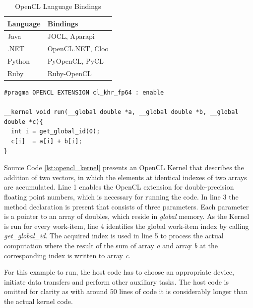 \begin{table}[htb]
	\centering
	\begin{adjustbox}{width=0.3\textwidth}
		\small
		\begin{tabular}{l | l}
			\textbf{Language}	& \textbf{Bindings}   \\
			\hline
			Java        &  JOCL, Aparapi\\
			.NET        &  OpenCL.NET, Cloo\\
			Python      &  PyOpenCL, PyCL\\
			Ruby	    &  Ruby-OpenCL\\


		\end{tabular}
	\end{adjustbox}

	\caption{OpenCL Language Bindings}
	\label{table:opencl_language_bindings}
\end{table}

\begin{minipage}{\linewidth}

\begin{lstlisting}[caption=OpenCL Vector Addition Kernel,captionpos=b,label={lst:opencl_kernel}]
#pragma OPENCL EXTENSION cl_khr_fp64 : enable

__kernel void run(__global double *a, __global double *b, __global double *c){
  int i = get_global_id(0);
  c[i]  = a[i] + b[i];
}
\end{lstlisting}
\end{minipage}
Source Code \ref{lst:opencl_kernel} presents an OpenCL Kernel that describes the addition of two vectors, in which the elements at identical indexes of two arrays are accumulated. Line 1 enables the OpenCL extension for double-precision floating point numbers, which is necessary for running the code. In line 3 the method declaration is present that consists of three parameters. Each parameter is a pointer to an array of doubles, which reside in \textit{global} memory. As the Kernel is run for every work-item, line 4 identifies the global work-item index by calling \textit{get\_global\_id}. The acquired index is used in line 5 to process the actual computation where the result of the sum of array \textit{a} and array \textit{b} at the corresponding index is written to array \textit{c}.

For this example to run, the host code has to choose an appropriate device, initiate data transfers and perform other auxiliary tasks. The host code is omitted for clarity as with around 50 lines of code it is considerably longer than the actual kernel code.

